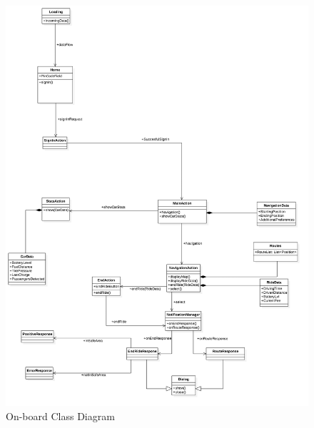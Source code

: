 \FloatBarrier
\FloatBarrier
\begin{figure}
\hspace{-15mm}
\includegraphics[scale=0.35]{Images/ClassDiagram/Display.png}
\caption{On-board Class Diagram}
\end{figure}
\FloatBarrier
\newpage

